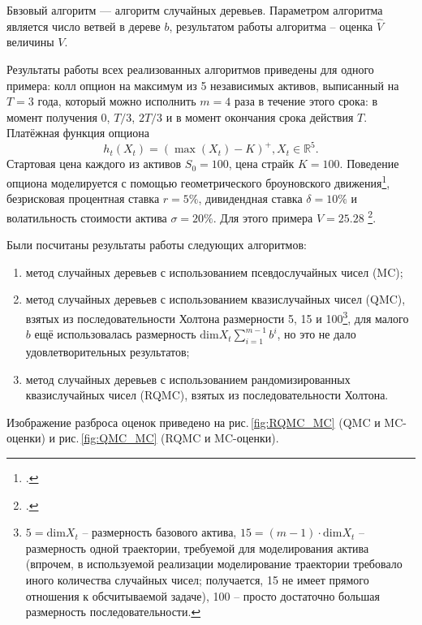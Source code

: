\documentclass{article}
\begin{document}
Бвзовый алгоритм --- алгоритм случайных деревьев. Параметром алгоритма является число ветвей в дереве $b$, результатом работы алгоритма -- оценка $\hat V$ величины $V$. 

Результаты работы всех реализованных алгоритмов приведены для одного примера: колл опцион на максимум из 5 независимых активов, выписанный на $T = 3$ года, который можно исполнить $m = 4$ раза в течение этого срока: в момент получения 0, $T/ 3$, $2T / 3$ и в момент окончания срока действия $T$. Платёжная функция опциона $$h_t(X_t) = \left(\max(X_t) - K\right)^+, X_t\in \mathbb R^5.$$
Стартовая цена каждого из активов $S_0 = 100$, цена страйк $K = 100$. Поведение опциона моделируется с помощью геометрического броуновского движения\footcite[стр.~1336]{Broadie1997}, безрисковая процентная ставка $r = 5\%$, дивидендная ставка $\delta = 10\%$ и волатильность стоимости актива $\sigma = 20\%$. Для этого примера $V = 25.28$ \footcite{Broadie2004}.

Были посчитаны результаты работы следующих алгоритмов: 
\begin{enumerate}[noitemsep,topsep=0pt]
\item метод случайных деревьев с использованием псевдослучайных чисел (MC);
\item метод случайных деревьев с использованием квазислучайных чисел (QMC), взятых из последовательности Холтона размерности 5, 15 и 100\footnote{$5 = \mathrm{dim} X_t$ -- размерность базового актива, $15 = (m-1) \cdot \mathrm{dim} X_t$ -- размерность одной траектории, требуемой для моделирования актива (впрочем, в используемой реализации моделирование траектории требовало иного количества случайных чисел; получается, 15 не имеет прямого отношения к обсчитываемой задаче), 100 -- просто достаточно большая размерность последовательности.}, для малого $b$ ещё использовалась размерность $\mathrm{dim} X_t \sum_{i=1}^{m-1} b^i$, но это не дало удовлетворительных результатов;
\item метод случайных деревьев с использованием рандомизированных квазислучайных чисел (RQMC), взятых из последовательности Холтона.
\end{enumerate}

Изображение разброса оценок приведено на рис.\,\ref{fig:RQMC_MC} (QMC и MC-оценки) и рис.\,\ref{fig:QMC_MC} (RQMC и MC-оценки).
\end{document}
